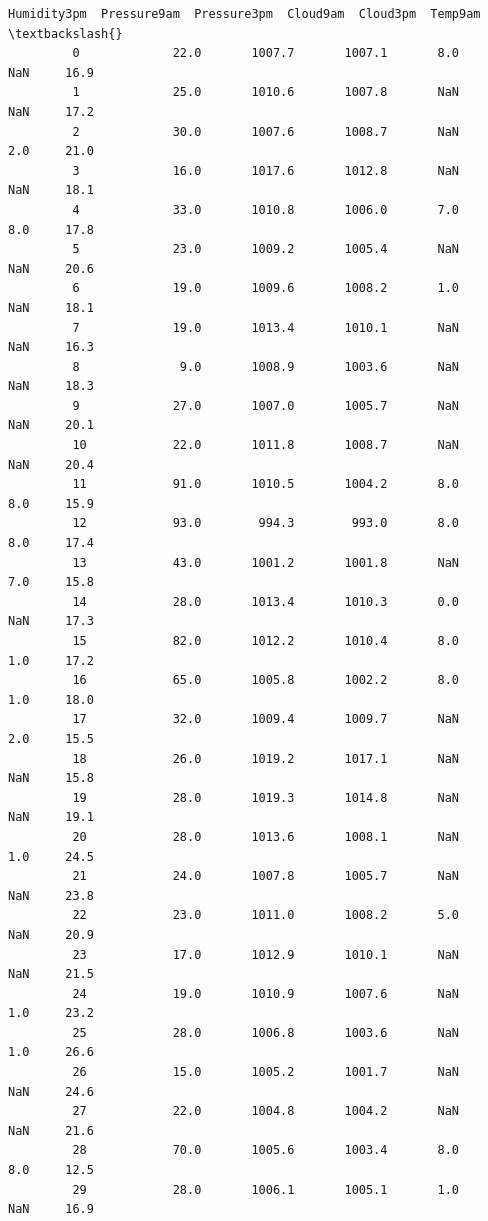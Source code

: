 \documentclass[11pt]{article}
\begin{document}
\begin{Verbatim}[commandchars=\\\{\}]
                Humidity3pm  Pressure9am  Pressure3pm  Cloud9am  Cloud3pm  Temp9am  \textbackslash{}
         0             22.0       1007.7       1007.1       8.0       NaN     16.9   
         1             25.0       1010.6       1007.8       NaN       NaN     17.2   
         2             30.0       1007.6       1008.7       NaN       2.0     21.0   
         3             16.0       1017.6       1012.8       NaN       NaN     18.1   
         4             33.0       1010.8       1006.0       7.0       8.0     17.8   
         5             23.0       1009.2       1005.4       NaN       NaN     20.6   
         6             19.0       1009.6       1008.2       1.0       NaN     18.1   
         7             19.0       1013.4       1010.1       NaN       NaN     16.3   
         8              9.0       1008.9       1003.6       NaN       NaN     18.3   
         9             27.0       1007.0       1005.7       NaN       NaN     20.1   
         10            22.0       1011.8       1008.7       NaN       NaN     20.4   
         11            91.0       1010.5       1004.2       8.0       8.0     15.9   
         12            93.0        994.3        993.0       8.0       8.0     17.4   
         13            43.0       1001.2       1001.8       NaN       7.0     15.8   
         14            28.0       1013.4       1010.3       0.0       NaN     17.3   
         15            82.0       1012.2       1010.4       8.0       1.0     17.2   
         16            65.0       1005.8       1002.2       8.0       1.0     18.0   
         17            32.0       1009.4       1009.7       NaN       2.0     15.5   
         18            26.0       1019.2       1017.1       NaN       NaN     15.8   
         19            28.0       1019.3       1014.8       NaN       NaN     19.1   
         20            28.0       1013.6       1008.1       NaN       1.0     24.5   
         21            24.0       1007.8       1005.7       NaN       NaN     23.8   
         22            23.0       1011.0       1008.2       5.0       NaN     20.9   
         23            17.0       1012.9       1010.1       NaN       NaN     21.5   
         24            19.0       1010.9       1007.6       NaN       1.0     23.2   
         25            28.0       1006.8       1003.6       NaN       1.0     26.6   
         26            15.0       1005.2       1001.7       NaN       NaN     24.6   
         27            22.0       1004.8       1004.2       NaN       NaN     21.6   
         28            70.0       1005.6       1003.4       8.0       8.0     12.5   
         29            28.0       1006.1       1005.1       1.0       NaN     16.9   

\end{Verbatim}
\end{document}
